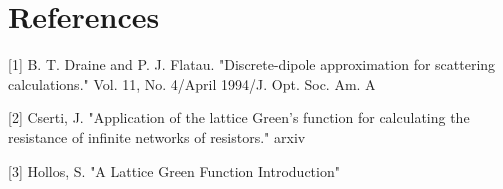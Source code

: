 \documentclass[12pt]{article}
\begin{document}
 


 




\section{References}
[1] B. T. Draine and P. J. Flatau. "Discrete-dipole approximation for scattering calculations." Vol. 11, No. 4/April 1994/J. Opt. Soc. Am. A

[2] Cserti, J. "Application of the lattice Green's function for calculating the resistance of infinite networks of resistors." arxiv

[3] Hollos, S. "A Lattice Green Function Introduction"
\end{document}
